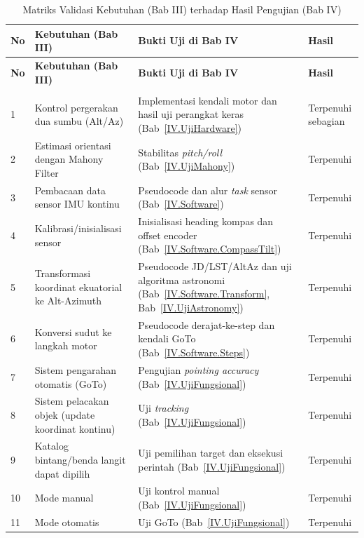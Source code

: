 \begin{longtable}{|b{}|p{}|p{}|p{}|}
    \caption{Matriks Validasi Kebutuhan (Bab III) terhadap Hasil Pengujian (Bab IV)}
    \label{table:4.validasi_kebutuhan} \\
    \hline
    \textbf{No} & \textbf{Kebutuhan (Bab III)} & \textbf{Bukti Uji di Bab IV} & \textbf{Hasil} \\
    \hline
    \endfirsthead
    \hline
    \textbf{No} & \textbf{Kebutuhan (Bab III)} & \textbf{Bukti Uji di Bab IV} & \textbf{Hasil} \\
    \hline
    \endhead
    \hline
    \endfoot
    \hline
    \endlastfoot

    \multicolumn{4}{|l|}{\textbf{A. Kebutuhan Fungsional (rujukan: Tabel~\ref{table:3.kebutuhanF})}} \\ \hline
    1 & Kontrol pergerakan dua sumbu (Alt/Az) & Implementasi kendali motor dan hasil uji perangkat keras (Bab~\ref{IV.UjiHardware}) & Terpenuhi sebagian \\ \hline
    2 & Estimasi orientasi dengan Mahony Filter & Stabilitas \textit{pitch/roll} (Bab~\ref{IV.UjiMahony}) & Terpenuhi \\ \hline
    3 & Pembacaan data sensor IMU kontinu & Pseudocode dan alur \textit{task} sensor (Bab~\ref{IV.Software}) & Terpenuhi \\ \hline
    4 & Kalibrasi/inisialisasi sensor & Inisialisasi heading kompas dan offset encoder (Bab~\ref{IV.Software.CompassTilt}) & Terpenuhi \\ \hline
    5 & Transformasi koordinat ekuatorial ke Alt-Azimuth & Pseudocode JD/LST/AltAz dan uji algoritma astronomi (Bab~\ref{IV.Software.Transform}, Bab~\ref{IV.UjiAstronomy}) & Terpenuhi \\ \hline
    6 & Konversi sudut ke langkah motor & Pseudocode derajat-ke-step dan kendali GoTo (Bab~\ref{IV.Software.Steps}) & Terpenuhi \\ \hline
    7 & Sistem pengarahan otomatis (GoTo) & Pengujian \textit{pointing accuracy} (Bab~\ref{IV.UjiFungsional}) & Terpenuhi \\ \hline
    8 & Sistem pelacakan objek (update koordinat kontinu) & Uji \textit{tracking} (Bab~\ref{IV.UjiFungsional}) & Terpenuhi \\ \hline
    9 & Katalog bintang/benda langit dapat dipilih & Uji pemilihan target dan eksekusi perintah (Bab~\ref{IV.UjiFungsional}) & Terpenuhi \\ \hline
    10 & Mode manual & Uji kontrol manual (Bab~\ref{IV.UjiFungsional}) & Terpenuhi \\ \hline
    11 & Mode otomatis & Uji GoTo (Bab~\ref{IV.UjiFungsional}) & Terpenuhi \\ \hline


\end{longtable}

